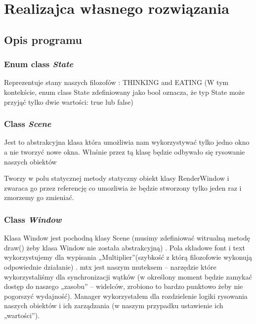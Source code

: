 \documentclass[a4paper, 12pt]{report}
\begin{document}
\chapter{Realizajca własnego rozwiązania}

\section{Opis programu}

\subsection{Enum class \emph{State}}
Reprezentuje stany naszych filozofów : THINKING and EATING (W tym kontekście, enum class State zdefiniowany jako bool oznacza, że typ State może przyjąć tylko dwie wartości: true lub false)

\subsection{Class \emph{Scene}}

Jest to abstrakcyjna klasa która umożliwia nam wykorzystywać tylko jedno okno a nie tworzyć nowe okna. Właśnie przez tą klasę będzie odbywało się rysowanie naszych obiektów



Tworzy w polu statycznej metody statyczny obiekt klasy RenderWindow i zwaraca go przez referencję co umozliwia że będzie stworzony tylko jeden raz i zmorzemy go zmieniać.

\subsection{Class \emph{Window}}

Klasa Window jest pochodną klasy Scene (musimy zdefiniować witrualną metodę draw() żeby klasa Window nie została abstrakcyjną) . Pola składowe font i text  wykorzystujemy dla wypisania „Multiplier”(szybkość z którą filozofowie wykonują odpowiednie działanie) . mtx jest naszym muteksem – narzędzie które wykorzystaliśmy dla synchronizacji wątków (w określony moment będzie zamykać dostęp do naszego „zasobu” – widelców, zrobiono to bardzo punktowo żeby nie pogorszyć wydajność). Manager wykorzystałem dla rozdzielenie logiki rysowania naszych obiektów i ich zarządzania (w naszym przypadku ustawienie ich „wartości”). 


\end{document}
